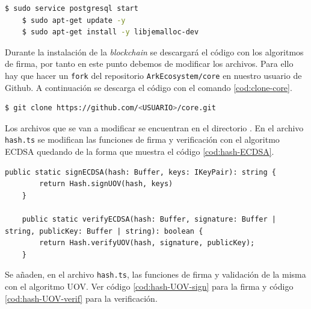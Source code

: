 \begin{lstlisting}[language=Bash,caption=Instalación \textit{blockchain}. Parte X, label=cod:start-sql, style=Consola]
	$ sudo service postgresql start
	$ sudo apt-get update -y 
	$ sudo apt-get install -y libjemalloc-dev
\end{lstlisting}

Durante la instalación de la \textit{blockchain} se descargará el código con los algoritmos de firma, por tanto en este punto debemos de modificar los archivos. Para ello hay que hacer un \texttt{fork} del repositorio \texttt{ArkEcosystem/core} \cite{ark-core} en nuestro usuario de Github. A continuación se descarga el código con el comando \ref{cod:clone-core}.

\begin{lstlisting}[language=Bash,caption=Clonar nuevo core, label=cod:clone-core, style=Consola]
	$ git clone https://github.com/<USUARIO>/core.git
\end{lstlisting}

Los archivos que se van a modificar se encuentran en el directorio . En el archivo \texttt{hash.ts} se modifican las funciones de firma y verificación con el algoritmo ECDSA quedando de la forma que muestra el código \ref{cod:hash-ECDSA}.

\begin{lstlisting}[caption=Modificación archivo \texttt{hash.ts}. Parte I, label=cod:hash-ECDSA, style=TypeScript]
	public static signECDSA(hash: Buffer, keys: IKeyPair): string {
		return Hash.signUOV(hash, keys)
	}

	public static verifyECDSA(hash: Buffer, signature: Buffer | string, publicKey: Buffer | string): boolean {
		return Hash.verifyUOV(hash, signature, publicKey);
	}
\end{lstlisting}

\newpage
Se añaden, en el archivo \texttt{hash.ts}, las funciones de firma y validación de la misma con el algoritmo UOV. Ver código \ref{cod:hash-UOV-sign} para la firma y código \ref{cod:hash-UOV-verif} para la verificación.

